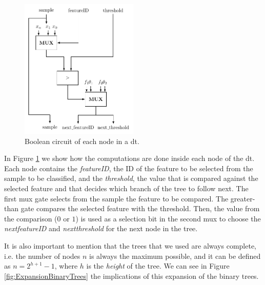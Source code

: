 \begin{figure}[ht]
  \centering
  \includegraphics[width=0.50\textwidth]{images/decision_tree_node.pdf}
  \caption{Boolean circuit of each node in a \acs{dt}.}
  \label{fig:DTNode}
\end{figure}
In Figure \ref{fig:DTNode} we show how the computations are done inside each node of the \ac{dt}. Each node contains the \textit{featureID}, the ID of the feature to be selected from the sample to be classified, and the \textit{threshold}, the value that is compared against the selected feature and that decides which branch of the tree to follow next. The first \ac{mux} gate selects from the sample the feature to be compared. The greater-than gate compares the selected feature with the threshold. Then, the value from the comparison ($0$ or $1$) is used as a selection bit in the second \ac{mux} to choose the \textit{next\textunderscore featureID} and \textit{next\textunderscore threshold} for the next node in the tree. 



It is also important to mention that the trees that we used are always complete, i.e. the number of nodes $n$ is always the maximum possible, and it can be defined as $n=2^{h+1}-1$, where $h$ is the \textit{height} of the tree. We can see in Figure \ref{fig:ExpansionBinaryTrees} the implications of this expansion of the binary trees.


